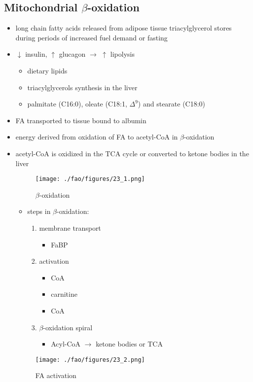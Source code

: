 \documentclass{scrartcl}
\begin{document}
\subsection{Mitochondrial \(\beta\)-oxidation}
\label{sec:org39d9308}
\begin{itemize}
\item long chain fatty acids released from adipose tissue triacylglycerol
stores during periods of increased fuel demand or fasting
\item \(\downarrow\) insulin, \(\uparrow\) glucagon \(\to\) \(\uparrow\) lipolysis
\begin{itemize}
\item dietary lipids
\item triacylglycerols synthesis in the liver
\item palmitate (C16:0), oleate (C18:1, \(\Delta^{\text{9}}\)) and stearate (C18:0)
\end{itemize}
\item FA transported to tissue bound to albumin
\item energy derived from oxidation of FA to acetyl-CoA in \(\beta\)-oxidation
\item acetyl-CoA is oxidized in the TCA cycle or converted to ketone bodies in the liver

\begin{figure}[htbp]
\centering
\texttt{[image: ./fao/figures/23\_1.png]}
\caption{\label{fig:org74eefce}
\(\beta\)-oxidation}
\end{figure}

\begin{itemize}
\item steps in \(\beta\)-oxidation:
\begin{enumerate}
\item membrane transport
\begin{itemize}
\item FaBP
\end{itemize}
\item activation
\begin{itemize}
\item CoA
\item carnitine
\item CoA
\end{itemize}
\item \(\beta\)-oxidation spiral
\begin{itemize}
\item Acyl-CoA \(\to\) ketone bodies or TCA
\end{itemize}
\end{enumerate}
\end{itemize}

\begin{figure}[htbp]
\centering
\texttt{[image: ./fao/figures/23\_2.png]}
\caption{\label{fig:org3c2fe70}
FA activation}
\end{figure}
\end{itemize}
\end{document}
